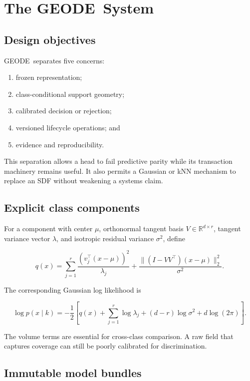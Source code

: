 \documentclass[12pt,oneside]{report}
\newcommand{\systemname}{GEODE}
\begin{document}
\chapter{The \systemname\ System}

\section{Design objectives}

\systemname\ separates five concerns:

\begin{enumerate}
\item frozen representation;
\item class-conditional support geometry;
\item calibrated decision or rejection;
\item versioned lifecycle operations; and
\item evidence and reproducibility.
\end{enumerate}

This separation allows a head to fail predictive parity while its transaction
machinery remains useful. It also permits a Gaussian or kNN mechanism to
replace an SDF without weakening a systems claim.

\section{Explicit class components}

For a component with center $\mu$, orthonormal tangent basis $V\in
\mathbb{R}^{d\times r}$, tangent variance vector $\lambda$, and isotropic
residual variance $\sigma^2$, define

\begin{equation}
q(x)=
\sum_{j=1}^{r}\frac{(v_j^\top(x-\mu))^2}{\lambda_j}
+
\frac{\lVert(I-VV^\top)(x-\mu)\rVert_2^2}{\sigma^2}.
\end{equation}

The corresponding Gaussian log likelihood is

\begin{equation}
\log p(x\mid k)=-\frac{1}{2}
\left[
q(x)+\sum_{j=1}^{r}\log\lambda_j+
(d-r)\log\sigma^2+d\log(2\pi)
\right].
\end{equation}

The volume terms are essential for cross-class comparison. A raw field that
captures coverage can still be poorly calibrated for discrimination.

\section{Immutable model bundles}
\end{document}
